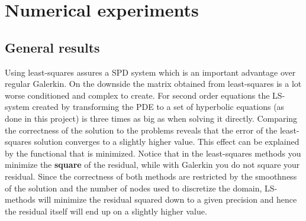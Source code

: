 
\chapter{Numerical experiments} %

\label{chap:results} %


\section{General results}
Using least-squares assures a SPD system which is an important advantage over regular Galerkin. On the downside the matrix obtained from least-squares is a lot worse conditioned and complex to create. For second order equations the LS-system created by transforming the PDE to a set of hyperbolic equations (as done in this project) is three times as big as when solving it directly. Comparing the correctness of the solution to the problems
reveals that the error of the least-squares solution converges to a slightly higher value. This effect can be explained by the functional that is minimized. Notice that in the least-squares methods you minimize the \textbf{square} of the residual, while with Galerkin you do not square your residual. Since the correctness of both methods are restricted by the smoothness of the solution and the number of nodes used to discretize the domain, LS-methods will minimize the residual squared down to a given precision and hence the residual itself will end up on a slightly higher value. 
%
